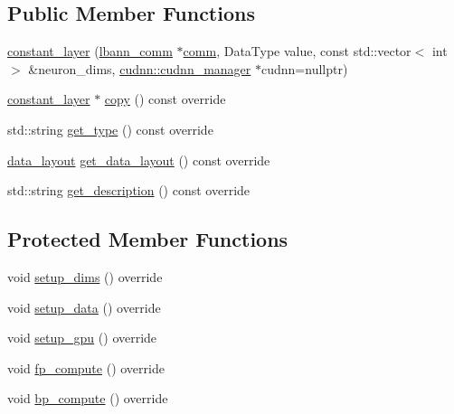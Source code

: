 \subsection*{Public Member Functions}
\begin{DoxyCompactItemize}
\item 
\hyperlink{classlbann_1_1constant__layer_a00b24316ac4ac313feb751cb00d850fc}{constant\+\_\+layer} (\hyperlink{classlbann_1_1lbann__comm}{lbann\+\_\+comm} $\ast$\hyperlink{file__io_8cpp_ab048c6f9fcbcfaa57ce68b00263dbebe}{comm}, Data\+Type value, const std\+::vector$<$ int $>$ \&neuron\+\_\+dims, \hyperlink{classlbann_1_1cudnn_1_1cudnn__manager}{cudnn\+::cudnn\+\_\+manager} $\ast$cudnn=nullptr)
\item 
\hyperlink{classlbann_1_1constant__layer}{constant\+\_\+layer} $\ast$ \hyperlink{classlbann_1_1constant__layer_adf44af96fef92b565a933b04fecd0fa2}{copy} () const override
\item 
std\+::string \hyperlink{classlbann_1_1constant__layer_ae4fb6731f212f6889e31f0c6b7ba9712}{get\+\_\+type} () const override
\item 
\hyperlink{base_8hpp_a786677cbfb3f5677b4d84f3056eb08db}{data\+\_\+layout} \hyperlink{classlbann_1_1constant__layer_ac69dbc39164ddb6cee7f61434bdb317d}{get\+\_\+data\+\_\+layout} () const override
\item 
std\+::string \hyperlink{classlbann_1_1constant__layer_a2745baa79137db746795634144b99080}{get\+\_\+description} () const override
\end{DoxyCompactItemize}
\subsection*{Protected Member Functions}
\begin{DoxyCompactItemize}
\item 
void \hyperlink{classlbann_1_1constant__layer_a147f3510683632f90bd1491f80d8ef32}{setup\+\_\+dims} () override
\item 
void \hyperlink{classlbann_1_1constant__layer_ad46d9db2e6bad4204dcedd2be60bfb1a}{setup\+\_\+data} () override
\item 
void \hyperlink{classlbann_1_1constant__layer_aa3450d358b093a29067500acc0ac4dff}{setup\+\_\+gpu} () override
\item 
void \hyperlink{classlbann_1_1constant__layer_a15b919ed869f2c815e1613dfb42b317c}{fp\+\_\+compute} () override
\item 
void \hyperlink{classlbann_1_1constant__layer_a88c9fae7cb03b68b9a8b103877ac2c6d}{bp\+\_\+compute} () override
\end{DoxyCompactItemize}
